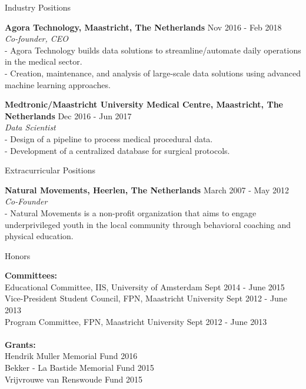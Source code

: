 \documentclass{resume}
\begin{document}
\begin{sections}{Industry Positions}

{\bf Agora Technology, Maastricht, The Netherlands} \hfill {Nov 2016 - Feb 2018} 
\\{\textit{Co-founder, CEO}}
\\- Agora Technology builds data solutions to streamline/automate daily operations in the medical sector.
\\- Creation, maintenance, and analysis of large-scale data solutions using advanced machine learning approaches.

{\bf Medtronic/Maastricht University Medical Centre, Maastricht, The Netherlands} \hfill {Dec 2016 - Jun 2017} 
\\{\textit{Data Scientist}}
\\- Design of a pipeline to process medical procedural data.
\\- Development of a centralized database for surgical protocols.

\end{sections}

\begin{sections}{Extracurricular Positions}

{\bf Natural Movements, Heerlen, The Netherlands} \hfill {March 2007 - May 2012} 
\\{\textit{Co-Founder}}
\\- Natural Movements is a non-profit organization that aims to engage underprivileged youth in the local community through behavioral coaching and physical education.

\end{sections}

\begin{sections}{Honors}

{\bf Committees:}
\\
{Educational Committee, IIS, University of Amsterdam} \hfill {Sept 2014 - June 2015} 
\\
{Vice-President Student Council, FPN, Maastricht University} \hfill {Sept 2012 - June 2013} 
\\
{Program Committee, FPN, Maastricht University} \hfill {Sept 2012 - June 2013}
\\
\\
{\bf Grants:}
\\
{Hendrik Muller Memorial Fund} \hfill {2016}
\\
{Bekker - La Bastide Memorial Fund} \hfill {2015}
\\
{Vrijvrouwe van Renswoude Fund} \hfill {2015}

\end{sections}
\end{document}
